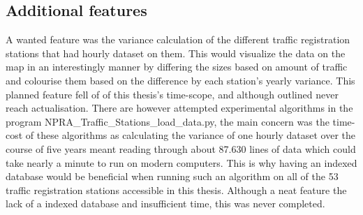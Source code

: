 \subsection{Additional features}
A wanted feature was the variance calculation of the different traffic registration stations that had hourly dataset on them. This would visualize the data on the map in an interestingly manner by differing the sizes based on amount of traffic and colourise them based on the difference by each station's yearly variance. This planned feature fell of of this thesis's time-scope, and although outlined never reach actualisation. There are however attempted experimental algorithms in the program NPRA\_Traffic\_Stations\_load\_data.py, the main concern was the time-cost of these algorithms as calculating the variance of one hourly dataset over the course of five years meant reading through about 87.630 lines of data which could take nearly a minute to run on modern computers. This is why having an indexed database would be beneficial when running such an algorithm on all of the 53 traffic registration stations accessible in this thesis. Although a neat feature the lack of a indexed database and insufficient time, this was never completed.


